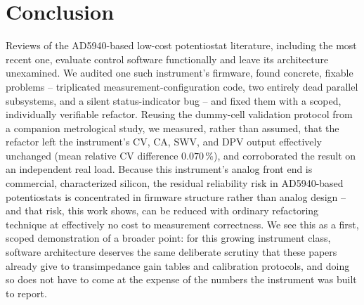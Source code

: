 \section{Conclusion}
\label{sec:conclusion}

Reviews of the AD5940-based low-cost potentiostat literature, including the
most recent one, evaluate control software functionally and leave its
architecture unexamined. We audited one such instrument's firmware, found
concrete, fixable problems -- triplicated measurement-configuration code,
two entirely dead parallel subsystems, and a silent status-indicator bug --
and fixed them with a scoped, individually verifiable refactor. Reusing the
dummy-cell validation protocol from a companion metrological study, we
measured, rather than assumed, that the refactor left the instrument's
CV, CA, SWV, and DPV output effectively unchanged (mean relative CV
difference $0.070\,\%$), and corroborated the result on an independent real
load. Because this instrument's analog front end is commercial,
characterized silicon, the residual reliability risk in AD5940-based
potentiostats is concentrated in firmware structure rather than analog
design -- and that risk, this work shows, can be reduced with ordinary
refactoring technique at effectively no cost to measurement correctness.
We see this as a first, scoped demonstration of a broader point: for this
growing instrument class, software architecture deserves the same
deliberate scrutiny that these papers already give to transimpedance gain
tables and calibration protocols, and doing so does not have to come at the
expense of the numbers the instrument was built to report.
